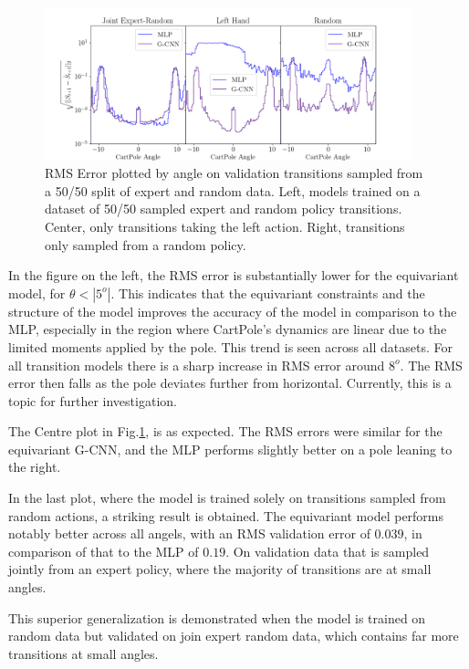 \begin{figure}[h!]
	\centering
	\includegraphics[width=0.95\textwidth]{./Figures/cart_pole_by_angle.png}
	\caption{RMS Error plotted by angle on validation transitions sampled from a 50/50 split of expert and random data. Left, models trained on a dataset of 50/50 sampled expert and random policy transitions. Center, only transitions taking the left action. Right, transitions only sampled from a random policy.}
	\label{fig:cp_model_angle}
\end{figure}

In the figure on the left, the RMS error is substantially lower for the equivariant model, for $\theta <|5^o|$. This indicates that the equivariant constraints and the structure of the model improves the accuracy of the model in comparison to the MLP, especially in the region where CartPole's dynamics are linear due to the limited moments applied by the pole. This trend is seen across all datasets. For all transition models there is a sharp increase in RMS error around $8^o$. The RMS error then falls as the pole deviates further from horizontal. Currently, this is a topic for further investigation.

The Centre plot in Fig.\ref{fig:cp_model_angle}, is as expected. The RMS errors were similar for the equivariant G-CNN, and the MLP performs slightly better on a pole leaning to the right.

In the last plot, where the model is trained solely on transitions sampled from random actions, a striking result is obtained. The equivariant model performs notably better across all angels, with an RMS validation error of $0.039$, in comparison of that to the MLP of $0.19$. On validation data that is sampled jointly from an expert policy, where the majority of transitions are at small angles.

This superior generalization is demonstrated when the model is trained on random data but validated on join expert random data, which contains far more transitions at small angles.

